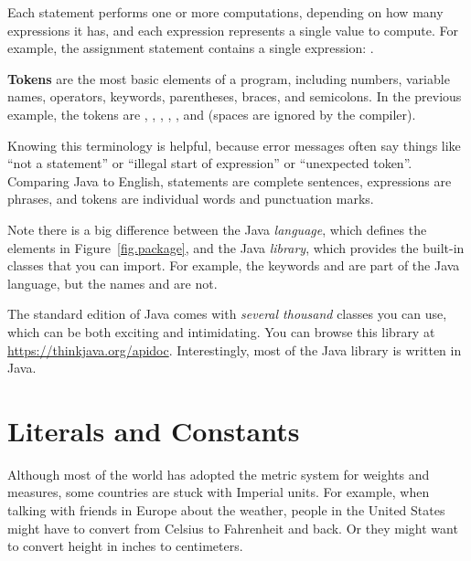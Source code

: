 Each statement performs one or more computations, depending on how many expressions it has, and each expression represents a single value to compute.
For example, the assignment statement  contains a single expression: .

{\bf Tokens} are the most basic elements of a program, including numbers, variable names, operators, keywords, parentheses, braces, and semicolons.
In the previous example, the tokens are , \java{=}, , \java{/}, , and \java{;} (spaces are ignored by the compiler).


Knowing this terminology is helpful, because error messages often say things like ``not a statement'' or ``illegal start of expression'' or ``unexpected token''.
Comparing Java to English, statements are complete sentences, expressions are phrases, and tokens are individual words and punctuation marks.

Note there is a big difference between the Java {\em language}, which defines the elements in Figure~\ref{fig.package}, and the Java {\em library}, which provides the built-in classes that you can import.
For example, the keywords  and  are part of the Java language, but the names  and  are not.

The standard edition of Java comes with {\em several thousand} classes you can use, which can be both exciting and intimidating.
You can browse this library at \url{https://thinkjava.org/apidoc}.
Interestingly, most of the Java library is written in Java.


\section{Literals and Constants}

Although most of the world has adopted the metric system for weights and measures, some countries are stuck with Imperial units.
For example, when talking with friends in Europe about the weather, people in the United States might have to convert from Celsius to Fahrenheit and back.
Or they might want to convert height in inches to centimeters.

